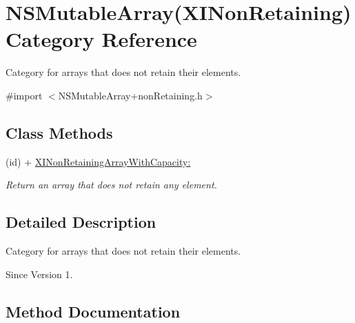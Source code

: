 \hypertarget{category_n_s_mutable_array_07_x_i_non_retaining_08}{}\section{N\+S\+Mutable\+Array(X\+I\+Non\+Retaining) Category Reference}
\label{category_n_s_mutable_array_07_x_i_non_retaining_08}


Category for arrays that does not retain their elements.  




{\ttfamily \#import $<$N\+S\+Mutable\+Array+non\+Retaining.\+h$>$}

\subsection*{Class Methods}
\begin{DoxyCompactItemize}
\item 
(id) + \hyperlink{category_n_s_mutable_array_07_x_i_non_retaining_08_a3c0806c97c9553c6a7e37b1942eae9a6}{X\+I\+Non\+Retaining\+Array\+With\+Capacity\+:}
\begin{DoxyCompactList}\small\item\em Return an array that does not retain any element. \end{DoxyCompactList}\end{DoxyCompactItemize}


\subsection{Detailed Description}
Category for arrays that does not retain their elements. 

\begin{DoxySince}{Since}
Version 1. 
\end{DoxySince}


\subsection{Method Documentation}
\hypertarget{category_n_s_mutable_array_07_x_i_non_retaining_08_a3c0806c97c9553c6a7e37b1942eae9a6}{}\label{category_n_s_mutable_array_07_x_i_non_retaining_08_a3c0806c97c9553c6a7e37b1942eae9a6} 
